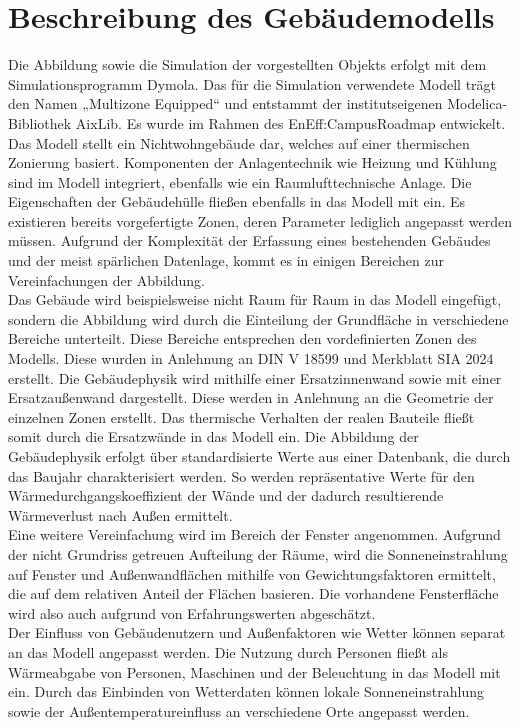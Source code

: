 \chapter{Beschreibung des Gebäudemodells}
\label{cha:Beschreibung des Gebäudemodells}

Die Abbildung sowie die Simulation der vorgestellten Objekts erfolgt mit dem Simulationsprogramm Dymola. Das für die Simulation verwendete Modell trägt den Namen „Multizone Equipped“ und entstammt der institutseigenen Modelica-Bibliothek AixLib. Es wurde im Rahmen des EnEff:CampusRoadmap entwickelt. Das Modell stellt ein Nichtwohngebäude dar, welches auf einer thermischen Zonierung basiert. Komponenten der Anlagentechnik wie Heizung und  Kühlung sind im Modell integriert, ebenfalls wie ein Raumlufttechnische Anlage. Die Eigenschaften der Gebäudehülle fließen ebenfalls in das Modell mit ein. Es existieren bereits vorgefertigte Zonen, deren Parameter lediglich angepasst werden müssen. Aufgrund der Komplexität der Erfassung eines bestehenden Gebäudes und der meist spärlichen Datenlage, kommt es in einigen Bereichen zur Vereinfachungen der Abbildung.\\
Das Gebäude wird beispielsweise nicht Raum für Raum in das Modell eingefügt, sondern die Abbildung wird durch die Einteilung der Grundfläche in verschiedene Bereiche unterteilt. Diese Bereiche entsprechen den vordefinierten Zonen des Modells. Diese wurden in Anlehnung an DIN V 18599 und Merkblatt SIA 2024 erstellt. Die Gebäudephysik wird mithilfe einer Ersatzinnenwand sowie mit einer Ersatzaußenwand dargestellt. Diese werden in Anlehnung an die Geometrie der einzelnen Zonen erstellt. Das thermische Verhalten der realen Bauteile fließt somit durch die Ersatzwände in das Modell ein. Die Abbildung der Gebäudephysik erfolgt über standardisierte Werte aus einer Datenbank, die durch das Baujahr charakterisiert werden. So werden repräsentative Werte für den Wärmedurchgangskoeffizient der Wände und der dadurch resultierende Wärmeverlust nach Außen ermittelt.\\
Eine weitere Vereinfachung wird im Bereich der Fenster angenommen. Aufgrund der nicht Grundriss getreuen Aufteilung der Räume, wird die Sonneneinstrahlung auf Fenster und Außenwandflächen mithilfe von Gewichtungsfaktoren ermittelt, die auf dem relativen Anteil der Flächen basieren. Die vorhandene Fensterfläche wird also auch aufgrund von Erfahrungswerten abgeschätzt.\\
Der Einfluss von Gebäudenutzern und Außenfaktoren wie Wetter können separat an das Modell angepasst werden. Die Nutzung durch Personen fließt als Wärmeabgabe von Personen, Maschinen und der Beleuchtung in das Modell mit ein. Durch das Einbinden von Wetterdaten können lokale Sonneneinstrahlung sowie der Außentemperatureinfluss an verschiedene Orte angepasst werden. \\
